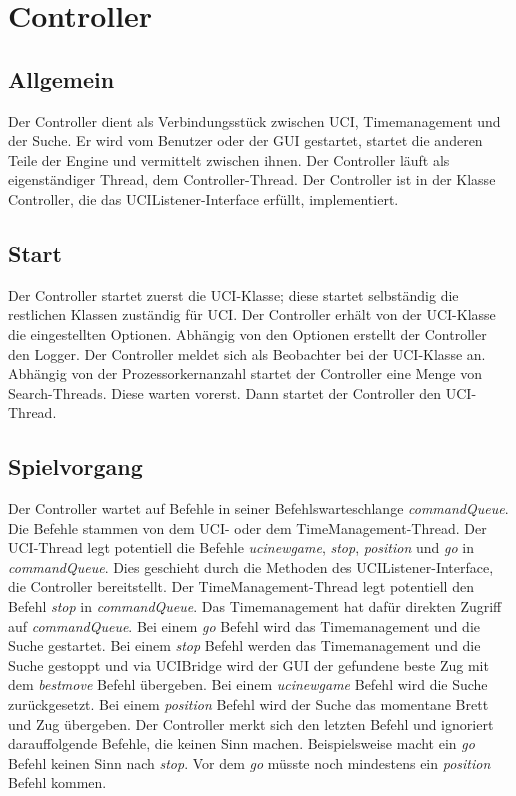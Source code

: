 \section{Controller}\label{sec:controller}
\subsection{Allgemein}\label{subsec:allgemeincontroller}
Der Controller dient als Verbindungsst\"uck zwischen UCI, Timemanagement und der Suche.
Er wird vom Benutzer oder der GUI gestartet, startet die anderen Teile der Engine und vermittelt zwischen ihnen.
Der Controller l\"auft als eigenst\"andiger Thread, dem Controller-Thread.
Der Controller ist in der Klasse Controller, die das UCIListener-Interface erf\"ullt, implementiert.
\subsection{Start}\label{subsec:start}
Der Controller startet zuerst die UCI-Klasse;
diese startet selbst\"andig die restlichen Klassen zust\"andig f\"ur UCI\@.
Der Controller erh\"alt von der UCI-Klasse die eingestellten Optionen.
Abh\"angig von den Optionen erstellt der Controller den Logger.
Der Controller meldet sich als Beobachter bei der UCI-Klasse an.
Abh\"angig von der Prozessorkernanzahl startet der Controller eine Menge von Search-Threads.
Diese warten vorerst.
Dann startet der Controller den UCI-Thread.
\subsection{Spielvorgang}\label{subsec:controllerspielvorgang}
Der Controller wartet auf Befehle in seiner Befehlswarteschlange \textit{commandQueue}.
Die Befehle stammen von dem UCI- oder dem TimeManagement-Thread.
Der UCI-Thread legt potentiell die Befehle \textit{ucinewgame}, \textit{stop}, \textit{position} und \textit{go} in
\textit{commandQueue}.
Dies geschieht durch die Methoden des UCIListener-Interface, die Controller bereitstellt.
Der TimeManagement-Thread legt potentiell den Befehl \textit{stop} in \textit{commandQueue}.
Das Timemanagement hat daf\"ur direkten Zugriff auf \textit{commandQueue}.
\newline
Bei einem \textit{go} Befehl wird das Timemanagement und die Suche gestartet.
\newline Bei einem \textit{stop} Befehl werden das Timemanagement und die Suche gestoppt und via UCIBridge wird der GUI
der gefundene beste Zug mit dem \textit{bestmove} Befehl \"ubergeben.
\newline Bei einem \textit{ucinewgame} Befehl wird die Suche zur\"uckgesetzt.
\newline Bei einem \textit{position} Befehl wird der Suche das momentane Brett und Zug \"ubergeben.
\newline
Der Controller merkt sich den letzten Befehl und ignoriert darauffolgende Befehle, die keinen Sinn machen\citeuci[41].
Beispielsweise macht ein \textit{go} Befehl keinen Sinn nach \textit{stop}.
Vor dem \textit{go} m\"usste noch mindestens ein \textit{position} Befehl kommen.